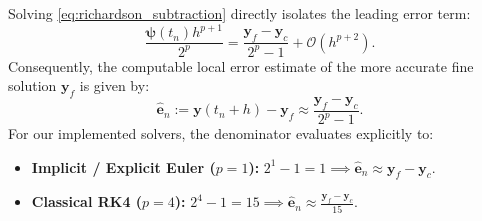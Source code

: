 \documentclass[11pt,a4paper]{article}
\theoremstyle{definition}
\theoremstyle{remark}
\begin{document}
Solving \eqref{eq:richardson_subtraction} directly isolates the leading error term:
\begin{equation}
\label{eq:principal_error_isolated}
\frac{\boldsymbol{\psi}(t_n) h^{p+1}}{2^p} = \frac{\mathbf{y}_f - \mathbf{y}_c}{2^p - 1} + \mathcal{O}(h^{p+2}).
\end{equation}
Consequently, the computable local error estimate of the more accurate fine solution $\mathbf{y}_f$ is given by:
\begin{equation}
\label{eq:local_error_estimator}
\hat{\mathbf{e}}_n := \mathbf{y}(t_n + h) - \mathbf{y}_f \approx \frac{\mathbf{y}_f - \mathbf{y}_c}{2^p - 1}.
\end{equation}
For our implemented solvers, the denominator evaluates explicitly to:
\begin{itemize}
    \item \textbf{Implicit / Explicit Euler ($p=1$):} $2^1 - 1 = 1 \implies \hat{\mathbf{e}}_n \approx \mathbf{y}_f - \mathbf{y}_c$.
    \item \textbf{Classical RK4 ($p=4$):} $2^4 - 1 = 15 \implies \hat{\mathbf{e}}_n \approx \frac{\mathbf{y}_f - \mathbf{y}_c}{15}$.
\end{itemize}
\end{document}
